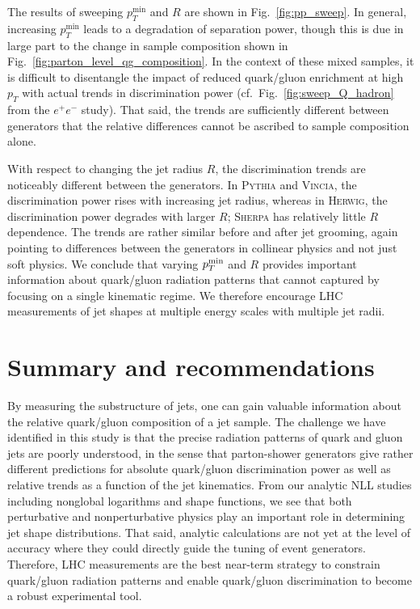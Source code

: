 \documentclass[11pt,letterpaper]{article}
\DeclareRobustCommand{\Fig}[1]{Fig.~\ref{#1}}
\begin{document}
The results of sweeping $p^\text{min}_T$ and $R$ are shown in \Fig{fig:pp_sweep}.  In general, increasing $p^\text{min}_T$ leads to a degradation of separation power, though this is due in large part to the change in sample composition shown in \Fig{fig:parton_level_qg_composition}.  In the context of these mixed samples, it is difficult to disentangle the impact of reduced quark/gluon enrichment at high $p_T$ with actual trends in discrimination power (cf.~\Fig{fig:sweep_Q_hadron} from the $e^+e^-$ study).  That said, the trends are sufficiently different between generators that the relative differences cannot be ascribed to sample composition alone.

With respect to changing the jet radius $R$, the discrimination trends are noticeably different between the generators.  In \textsc{Pythia} and \textsc{Vincia}, the discrimination power rises with increasing jet radius, whereas in \textsc{Herwig}, the discrimination power degrades with larger $R$; \textsc{Sherpa} has relatively little $R$ dependence.  The trends are rather similar before and after jet grooming, again pointing to differences between the generators in collinear physics and not just soft physics.  We conclude that varying $p_T^{\rm min}$ and $R$ provides important information about quark/gluon radiation patterns that cannot captured by focusing on a single kinematic regime.  We therefore encourage LHC measurements of jet shapes at multiple energy scales with multiple jet radii.  

\section{Summary and recommendations}
\label{sec:conclude}

By measuring the substructure of jets, one can gain valuable information about the relative quark/gluon composition of a jet sample.  The challenge we have identified in this study is that the precise radiation patterns of quark and gluon jets are poorly understood, in the sense that parton-shower generators give rather different predictions for absolute quark/gluon discrimination power as well as relative trends as a function of the jet kinematics.  From our analytic NLL studies including nonglobal logarithms and shape functions, we see that both perturbative and nonperturbative physics play an important role in determining jet shape distributions.  That said, analytic calculations are not yet at the level of accuracy where they could directly guide the tuning of event generators.  Therefore, LHC measurements are the best near-term strategy to constrain quark/gluon radiation patterns and enable quark/gluon discrimination to become a robust experimental tool.
\end{document}
